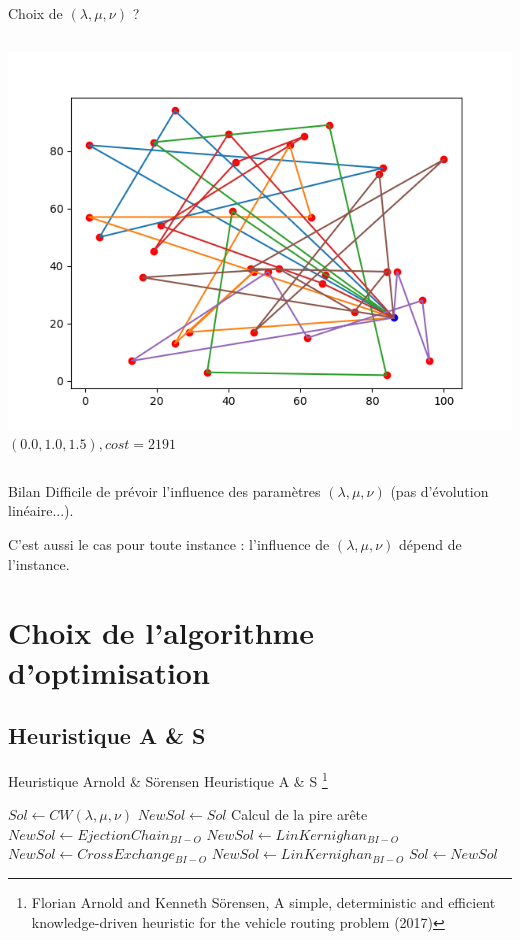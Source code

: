 \documentclass{beamer}
\begin{document}
\begin{frame}{Choix de $(\lambda,\mu,\nu)$ ?}
\begin{columns}[t]
 
  \begin{column}{4cm}
  	\centering
	\includegraphics[scale=0.27]{resCW001015.png}
 	$(0.0,1.0,1.5), cost = 2191$

  \end{column}
 \end{columns}
 
\begin{alertblock}{Bilan}
Difficile de prévoir l'influence des paramètres $(\lambda,\mu,\nu)$ (pas d'évolution linéaire...). 

C'est aussi le cas pour toute instance : l'influence de $(\lambda,\mu,\nu)$ dépend de l'instance.
\end{alertblock}

\end{frame}

\section{Choix de l'algorithme d'optimisation}

\subsection{Heuristique A \& S}

\begin{frame}{Heuristique Arnold \& Sörensen} 
Heuristique A \& S \footnote{Florian Arnold and Kenneth Sörensen, A simple, deterministic and efficient knowledge-driven heuristic for the vehicle routing problem (2017)}
\begin{algorithm}[H]
\DontPrintSemicolon %

$Sol \gets CW(\lambda,\mu,\nu)$\;
$NewSol \gets Sol$\;
 {
	Calcul de la pire arête\;
	$NewSol \gets EjectionChain_{BI-O}$\;
	$NewSol \gets LinKernighan_{BI-O}$\;
	$NewSol \gets CrossExchange_{BI-O}$\;
	$NewSol \gets LinKernighan_{BI-O}$\;
	 {
		$Sol \gets NewSol$\;
	}
}
\;

\end{algorithm}

\end{frame}
\end{document}

